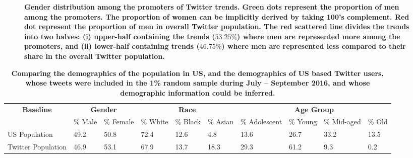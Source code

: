 \documentclass[letterpaper]{article}
\begin{document}
\begin{figure}[t]
\vspace{-2mm}
\caption{{\bf Gender distribution among the promoters of Twitter trends. Green dots represent the proportion of men among the promoters. The proportion of women can be implicitly derived by taking 100's complement. Red dot represent the proportion of men in overall Twitter population. The red scattered line divides the trends into two halves: (i) upper-half containing the trends ($53.25\%$) where men are represented more among the promoters, and (ii) lower-half containing trends ($46.75\%$) where men are represented less compared to their share in the overall Twitter population.}}
\label{fig:scatter_gender}
\vspace{-5mm}
\end{figure}

\begin{table*}[t]
\center
\small
\begin{tabular}{|p{}||p{}|p{}||p{}|p{}|p{}||p{}|p{}|p{}|p{}|}
\hline
\multicolumn{1}{|c||}{{\bf Baseline}} & \multicolumn{2}{c||}{{\bf Gender}} & \multicolumn{3}{c||}{{\bf Race}} & \multicolumn{4}{c|}{{\bf Age Group}}\\
\cline{2-10}
~ & \% Male & \% Female & \% White & \% Black & \% Asian & \% Adolescent & \% Young & \% Mid-aged & \% Old \\
\hline
US Population & 49.2 & 50.8 & 72.4 & 12.6 & 4.8 & 13.6 & 26.7 & 33.2 & 13.5 \\
\hline
Twitter Population  & 46.9 & 53.1 & 67.9 & 13.7 & 18.3 & 29.3 & 61.2 & 9.3 & 0.2 \\
\hline
\end{tabular}
\vspace*{-2mm}
\caption{{\bf Comparing the demographics of the population in US, and the demographics of US based Twitter users, whose tweets were included in the 1\% random sample during July -- September 2016, and whose demographic information could be inferred.}}
\label{tab:reference_dist}
\vspace*{-5mm}
\end{table*}
\end{document}
